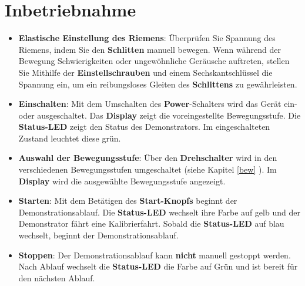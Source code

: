 %
%

\chapter{Inbetriebnahme}

\begin{itemize} \label{STU}
	
	\item \textbf{Elastische Einstellung des Riemens}: Überprüfen Sie Spannung des Riemens, indem Sie den \textbf{Schlitten} manuell bewegen. Wenn während der Bewegung Schwierigkeiten oder ungewöhnliche Geräusche auftreten, stellen Sie Mithilfe der \textbf{Einstellschrauben} und einem Sechskantschlüssel die Spannung ein, um ein reibungsloses Gleiten des \textbf{Schlittens} zu gewährleisten. 
	
	\item \textbf{Einschalten}: Mit dem Umschalten des \textbf{Power}-Schalters wird das Gerät ein- oder ausgeschaltet. Das \textbf{Display} zeigt die voreingestellte Bewegungsstufe. Die \textbf{Status-LED} zeigt den Status des Demonstrators. Im eingeschalteten Zustand leuchtet diese grün.
	
	\item \textbf{Auswahl der Bewegungsstufe}: Über den \textbf{Drehschalter} wird in den verschiedenen Bewegungsstufen umgeschaltet (siehe Kapitel \ref{bew} ). Im \textbf{Display} wird die ausgewählte Bewegungsstufe angezeigt.
	
	\item \textbf{Starten}: Mit dem Betätigen des \textbf{Start-Knopfs} beginnt der Demonstrationsablauf. Die \textbf{Status-LED} wechselt ihre Farbe auf gelb und der Demonstrator fährt eine Kalibrierfahrt. Sobald die \textbf{Status-LED} auf blau wechselt, beginnt der Demonstrationsablauf.
	
	\item \textbf{Stoppen}: Der Demonstrationsablauf kann \textbf{nicht} manuell gestoppt werden. Nach Ablauf wechselt die \textbf{Status-LED} die Farbe auf Grün und ist bereit für den nächsten Ablauf.
\end{itemize}